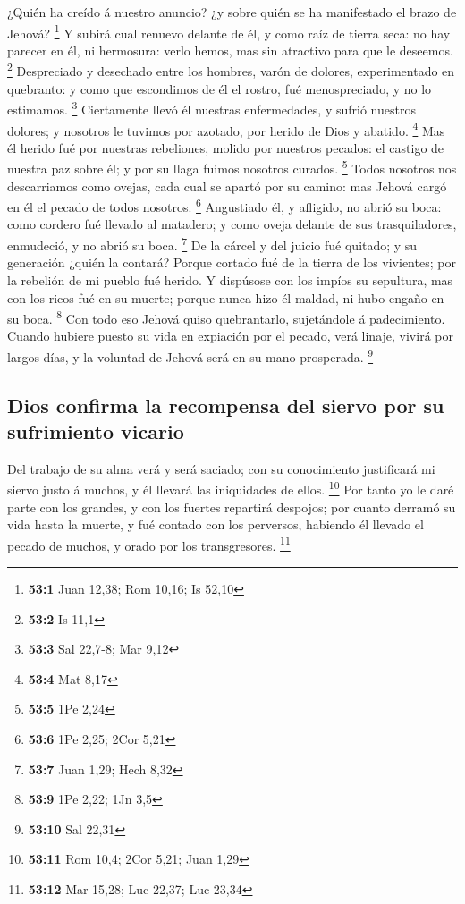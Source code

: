  ¿Quién ha creído á nuestro anuncio? ¿y sobre quién se ha
manifestado el brazo de Jehová? \footnote{\textbf{53:1} Juan 12,38; Rom
  10,16; Is 52,10}  Y subirá cual renuevo delante de él, y
como raíz de tierra seca: no hay parecer en él, ni hermosura: verlo
hemos, mas sin atractivo para que le deseemos. \footnote{\textbf{53:2}
  Is 11,1}  Despreciado y desechado entre los hombres,
varón de dolores, experimentado en quebranto: y como que escondimos de
él el rostro, fué menospreciado, y no lo estimamos. \footnote{\textbf{53:3}
  Sal 22,7-8; Mar 9,12}  Ciertamente llevó él nuestras
enfermedades, y sufrió nuestros dolores; y nosotros le tuvimos por
azotado, por herido de Dios y abatido. \footnote{\textbf{53:4} Mat 8,17}
 Mas él herido fué por nuestras rebeliones, molido por
nuestros pecados: el castigo de nuestra paz sobre él; y por su llaga
fuimos nosotros curados. \footnote{\textbf{53:5} 1Pe 2,24}
 Todos nosotros nos descarriamos como ovejas, cada cual se
apartó por su camino: mas Jehová cargó en él el pecado de todos
nosotros. \footnote{\textbf{53:6} 1Pe 2,25; 2Cor 5,21} 
Angustiado él, y afligido, no abrió su boca: como cordero fué llevado al
matadero; y como oveja delante de sus trasquiladores, enmudeció, y no
abrió su boca. \footnote{\textbf{53:7} Juan 1,29; Hech 8,32}
 De la cárcel y del juicio fué quitado; y su generación
¿quién la contará? Porque cortado fué de la tierra de los vivientes; por
la rebelión de mi pueblo fué herido.  Y dispúsose con los
impíos su sepultura, mas con los ricos fué en su muerte; porque nunca
hizo él maldad, ni hubo engaño en su boca. \footnote{\textbf{53:9} 1Pe
  2,22; 1Jn 3,5}  Con todo eso Jehová quiso quebrantarlo,
sujetándole á padecimiento. Cuando hubiere puesto su vida en expiación
por el pecado, verá linaje, vivirá por largos días, y la voluntad de
Jehová será en su mano prosperada. \footnote{\textbf{53:10} Sal 22,31}

\hypertarget{dios-confirma-la-recompensa-del-siervo-por-su-sufrimiento-vicario}{%
\subsection{Dios confirma la recompensa del siervo por su sufrimiento
vicario}\label{dios-confirma-la-recompensa-del-siervo-por-su-sufrimiento-vicario}}

 Del trabajo de su alma verá y será saciado; con su
conocimiento justificará mi siervo justo á muchos, y él llevará las
iniquidades de ellos. \footnote{\textbf{53:11} Rom 10,4; 2Cor 5,21; Juan
  1,29}  Por tanto yo le daré parte con los grandes, y
con los fuertes repartirá despojos; por cuanto derramó su vida hasta la
muerte, y fué contado con los perversos, habiendo él llevado el pecado
de muchos, y orado por los transgresores. \footnote{\textbf{53:12} Mar
  15,28; Luc 22,37; Luc 23,34}

